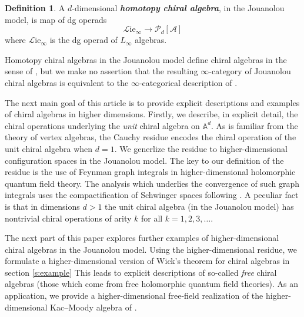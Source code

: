 \documentclass[11pt]{amsart}
\theoremstyle{definition}
\newtheorem*{defn*}{Definition}
\theoremstyle{remark}
\numberwithin{equation}{section}
\begin{document}
  \begin{defn*}
  A $d$-dimensional \textit{\textbf{homotopy chiral algebra}}, in the Jouanolou
model, is map of dg operads
  \begin{equation}\label{}
  \mathcal{L} \mathrm{ie}_\infty \to \mathcal{P}_d [\mathcal{A}]
  \end{equation}
  where $\mathcal{L}\mathrm{ie}_\infty$ is the dg operad of $L_\infty$ algebras.
\end{defn*}

Homotopy chiral algebras in the Jouanolou model define chiral algebras in the sense of \cite{FG}, but we make no
assertion that the resulting $\infty$-category of Jouanolou chiral algebras is equivalent to the $\infty$-categorical
description of \cite{FG}.

The next main goal of this article is to provide explicit descriptions and examples of chiral algebras in higher dimensions.
Firstly, we describe, in explicit detail, the chiral operations underlying the \textit{unit} chiral algebra on $\mathbb{A}^d$.
As is familiar from the theory of vertex algebras, the Cauchy residue encodes the chiral operation of the unit chiral algebra
when $d=1$.
We generlize the residue to higher-dimensional configuration spaces in the Jouanolou model.
The key to our definition of the residue is the use of Feynman graph integrals in higher-dimensional holomorphic quantum field theory.
The analysis which underlies the convergence of such graph integrals uses the compactification of Schwinger spaces
following \cite{wang2024feynman}.
A peculiar fact is that in dimensions $d > 1$ the unit chiral algebra (in the Jouanolou model) has nontrivial chiral
operations of arity $k$ for all $k = 1,2,3,\ldots$.

The next part of this paper explores further examples of higher-dimensional chiral algebras in the Jouanolou model.
Using the higher-dimensional residue, we formulate a higher-dimensional version of Wick's theorem for
chiral algebras in section \ref{s:example}
This leads to explicit descriptions of so-called \textit{free} chiral algebras (those which come from free holomorphic
quantum field theories).
As an application, we provide a higher-dimensional free-field realization of the higher-dimensional Kac--Moody algebra
of \cite{FHK}.
\end{document}
